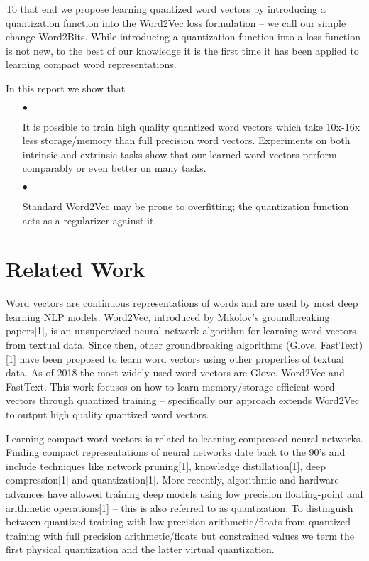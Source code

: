 \documentclass{article} %
\begin{document}
To that end we propose learning quantized word vectors by introducing
a quantization function into the Word2Vec loss formulation -- we call
our simple change Word2Bits. While introducing a quantization function
into a loss function is not new, to the best of our knowledge it is
the first time it has been applied to learning compact word representations.

In this report we show that
\begin{enumerate}
\item[$\bullet$]

  It is possible to train high quality quantized word vectors which
  take 10x-16x less storage/memory than full precision word
  vectors. Experiments on both intrinsic and extrinsic tasks show that
  our learned word vectors perform comparably or even better on many tasks.

\item[$\bullet$]

  Standard Word2Vec may be prone to overfitting; the quantization
  function acts as a regularizer against it.

\end{enumerate}

\section{Related Work}
Word vectors are continuous representations of words and are used by
most deep learning NLP models. Word2Vec, introduced by Mikolov's
groundbreaking papers[1], is an unsupervised neural network algorithm for
learning word vectors from textual data. Since then, other
groundbreaking algorithms (Glove, FastText) [1] have been proposed to
learn word vectors using other properties of textual data. As of 2018
the most widely used word vectors are Glove, Word2Vec and
FastText. This work focuses on how to learn memory/storage efficient
word vectors through quantized training -- specifically our approach
extends Word2Vec to output high quality quantized word vectors.

Learning compact word vectors is related to learning compressed neural
networks. Finding compact representations of neural
networks date back to the 90's and include techniques like network
pruning[1], knowledge distillation[1], deep compression[1] and
quantization[1]. More recently, algorithmic and hardware advances have
allowed training deep models using low precision floating-point and
arithmetic operations[1] -- this is also referred to as
quantization. To distinguish between quantized training with low
precision arithmetic/floats from quantized training with full
precision arithmetic/floats but constrained values we term the first
physical quantization and the latter virtual quantization.
\end{document}
